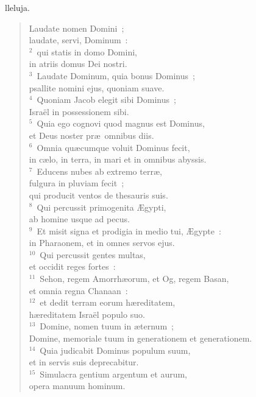 \bchapter
{}lleluja. \begin{flushleft}\begin{verse}\vspace{6pt}Laudate nomen Domini~;\\ laudate, servi, Dominum~:\\
${}^{2}$~qui statis in domo Domini,\\ in atriis domus Dei nostri.\\
${}^{3}$~Laudate Dominum, quia bonus Dominus~;\\ psallite nomini ejus, quoniam suave.\\
${}^{4}$~Quoniam Jacob elegit sibi Dominus~;\\ Isra\"el in possessionem sibi.\\
${}^{5}$~Quia ego cognovi quod magnus est Dominus,\\ et Deus noster pr\ae\ omnibus diis.\\
${}^{6}$~Omnia qu\ae cumque voluit Dominus fecit,\\ in c\ae lo, in terra, in mari et in omnibus abyssis.\\
${}^{7}$~Educens nubes ab extremo terr\ae ,\\ fulgura in pluviam fecit~;\\ qui producit ventos de thesauris suis.\\
${}^{8}$~Qui percussit primogenita \AE gypti,\\ ab homine usque ad pecus.\\
${}^{9}$~Et misit signa et prodigia in medio tui, \AE gypte~:\\ in Pharaonem, et in omnes servos ejus.\\
${}^{10}$~Qui percussit gentes multas,\\ et occidit reges fortes~:\\
${}^{11}$~Sehon, regem Amorrh\ae orum, et Og, regem Basan,\\ et omnia regna Chanaan~:\\
${}^{12}$~et dedit terram eorum h\ae reditatem,\\ h\ae reditatem Isra\"el populo suo.\\
${}^{13}$~Domine, nomen tuum in \ae ternum~;\\ Domine, memoriale tuum in generationem et generationem.\\
${}^{14}$~Quia judicabit Dominus populum suum,\\ et in servis suis deprecabitur.\\
${}^{15}$~Simulacra gentium argentum et aurum,\\ opera manuum hominum.\\

\end{verse}
\end{flushleft}
